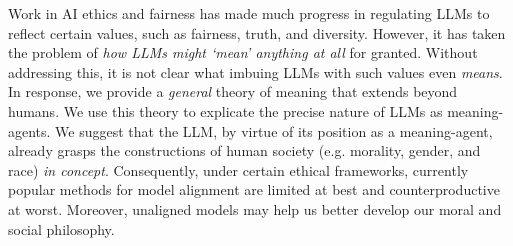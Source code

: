 
Work in AI ethics and fairness has made much progress in regulating LLMs to reflect certain values, such as fairness, truth, and diversity.
However, it has taken the problem of \textit{how LLMs might `mean' anything at all} for granted.
Without addressing this, it is not clear what imbuing LLMs with such values even \textit{means}.
In response, we provide a \textit{general} theory of meaning that extends beyond humans.
We use this theory to explicate the precise nature of LLMs as meaning-agents.
We suggest that the LLM, by virtue of its position as a meaning-agent, already grasps the constructions of human society (e.g. morality, gender, and race) \textit{in concept}.
Consequently, under certain ethical frameworks, currently popular methods for model alignment are limited at best and counterproductive at worst.
Moreover, unaligned models may help us better develop our moral and social philosophy.





